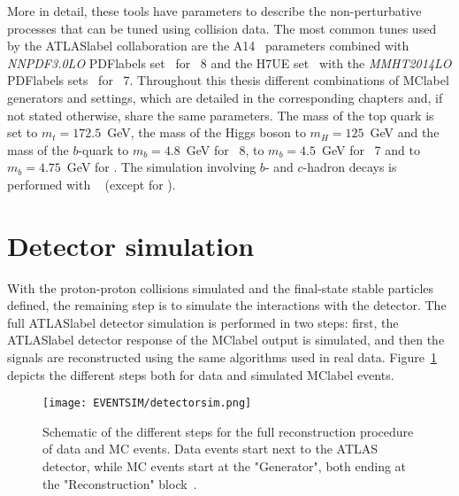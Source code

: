 More in detail, these tools have parameters to describe the non-perturbative processes that can be tuned using collision data. The most common tunes used by the \acrshort{ATLASlabel} collaboration are the A14~\cite{ATL-PHYS-PUB-2014-021} parameters combined with \textit{NNPDF3.0LO} \acrshort{PDFlabel}s set~\cite{BALL2013244} for \PYTHIA~8 and the H7UE set~\cite{Bellm2016} with the \textit{MMHT2014LO} \acrshort{PDFlabel}s sets~\cite{Harland-Lang2015} for \HERWIG~7. Throughout this thesis different combinations of \acrshort{MClabel} generators and settings, which are detailed in the corresponding chapters and, if not stated otherwise, share the same parameters. The mass of the top quark is set to $m_t=172.5$~GeV, the mass of the Higgs boson to $m_H=125$~GeV and the mass of the $b$-quark to $m_b=4.8$~GeV for \PYTHIA~8, to $m_b=4.5$~GeV for \HERWIG~7 and to $m_b=4.75$~GeV for \SHERPA. The simulation involving $b$- and $c$-hadron decays is performed with \EVTGEN~\cite{LANGE2001152}
(except for \SHERPA). 

\section{Detector simulation}

With the proton-proton collisions simulated and the final-state stable particles defined, the remaining step is to simulate the interactions with the detector. The full \acrshort{ATLASlabel} detector simulation is performed in two steps: first, the \acrshort{ATLASlabel} detector response of the \acrshort{MClabel} output is simulated, and then the signals are reconstructed using the same algorithms used in real data. Figure~\ref{figEVNTSIM:detectorsim} depicts the different steps both for data and simulated \acrshort{MClabel} events.

\begin{figure}[htbp]
    \RawFloats
    \begin{center}
    \texttt{[image: EVENTSIM/detectorsim.png]}
    \caption{
        Schematic of the different steps for the full reconstruction procedure of data and MC events. Data events start next to the ATLAS detector, while MC events start at the "Generator", both ending at the "Reconstruction" block~\cite{Aad_2010}.}
    \label{figEVNTSIM:detectorsim}
    \end{center}
\end{figure}

